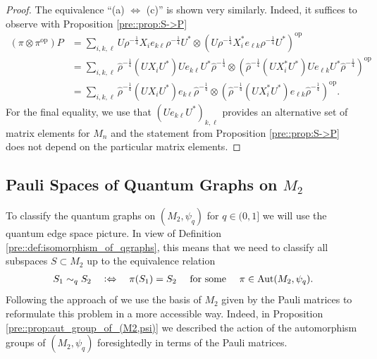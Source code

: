 \documentclass{amsart}
\DeclareMathOperator{\op}{op}
\begin{document}
\begin{proof}
    The equivalence ``(a) $\Leftrightarrow$ (c)'' is shown very similarly. Indeed, it suffices to observe with Proposition \ref{pre::prop:S->P}
    \begin{align*}
        (\pi \otimes \pi^\mathrm{op}) P
            &=
            \sum_{i,k,\ell} U \rho^{-\frac{1}{4}}X_ie_{k\ell}\rho^{-\frac{1}{4}} U^\ast \otimes
            \left(U \rho^{-\frac{1}{4}}X_i^*e_{\ell k}\rho^{-\frac{1}{4}} U^\ast \right)^{\op} \\
            &= 
            \sum_{i,k,\ell}\hat{\rho}^{-\frac{1}{4}} (U X_iU^\ast) U e_{k\ell} U^\ast \hat{\rho}^{-\frac{1}{4}}
            \otimes
            \left(\hat{\rho}^{-\frac{1}{4}} (U X_i^* U^\ast) U e_{\ell k} U^\ast \hat{\rho}^{-\frac{1}{4}}\right)^{\op}\\
            &= 
            \sum_{i,k,\ell}\hat{\rho}^{-\frac{1}{4}} (U X_iU^\ast) e_{k\ell} \hat{\rho}^{-\frac{1}{4}} 
            \otimes
            \left(\hat{\rho}^{-\frac{1}{4}} (U X_i^* U^\ast) e_{\ell k} \hat{\rho}^{-\frac{1}{4}}\right)^{\op}.
    \end{align*}
    For the final equality, we use that $(Ue_{k\ell}U^\ast)_{k, \ell}$ provides an alternative set of matrix elements for $M_n$ and the statement from Proposition \ref{pre::prop:S->P} does not depend on the particular matrix elements.
\end{proof}




\subsection{Pauli Spaces of Quantum Graphs on \texorpdfstring{$M_2$}{M2}}
\label{sec::quantum_edge_spaces_and_Pauli_matrices}



To classify the quantum graphs on $(M_2, \psi_q)$ for $q \in (0,1]$ we will use the quantum edge space picture. In view of Definition \ref{pre::def:isomorphism_of_qgraphs}, this means that we need to classify all subspaces $S \subset M_2$ up to the equivalence relation 
\begin{align*}
    S_1 \sim_q S_2
    \quad \vcentcolon \Leftrightarrow \quad 
    \pi(S_1) = S_2 \quad \text{ for some } \quad \pi \in \mathrm{Aut}(M_2, \psi_q).
\end{align*}
Following the approach of \cite{gromada_examples_2022} we use the basis of $M_2$ given by the Pauli matrices
to reformulate this problem in a more accessible way. Indeed, in Proposition \ref{pre::prop:aut_group_of_(M2,psi)} we described the action of the automorphism groups of $(M_2, \psi_q)$ foresightedly in terms of the Pauli matrices. 
\end{document}
